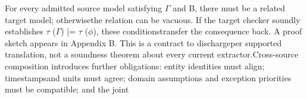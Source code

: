 

\noindent
For every admitted source model satisfying \ensuremath{\Gamma} and B, there must be a related target model; otherwise\linebreak[4]
the relation can be vacuous. If the target checker soundly establishes \ensuremath{\tau} (\ensuremath{\Gamma}) |= \ensuremath{\tau} (\ensuremath{\phi}), these conditions\linebreak[4]
transfer the consequence back. A proof sketch appears in Appendix B. This is a contract to discharge\linebreak[4]
per supported translation, not a soundness theorem about every current extractor.\linebreak[4]
Cross-source composition introduces further obligations: entity identities must align; timestamps\linebreak[4]
and units must agree; domain assumptions and exception priorities must be compatible; and the joint\par

